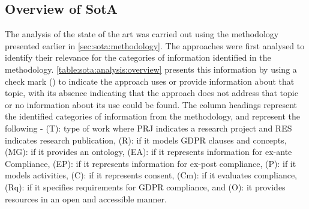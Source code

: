 \subsection{Overview of SotA}
The analysis of the state of the art was carried out using the methodology presented earlier in \autoref{sec:sota:methodology}.
The approaches were first analysed to identify their relevance for the categories of information identified in the methodology.
\autoref{table:sota:analysis:overview} presents this information by using a check mark (\cmark) to indicate the approach uses or provide information about that topic, with its absence indicating that the approach does not address that topic or no information about its use could be found.
The column headings represent the identified categories of information from the methodology, and represent the following - (T): type of work where PRJ indicates a research project and RES indicates research publication, (R): if it models GDPR clauses and concepts, (MG): if it provides an ontology, (EA): if it represents information for ex-ante Compliance, (EP): if it represents information for ex-post compliance, (P): if it models activities, (C): if it represents consent, (Cm): if it evaluates compliance, (Rq): if it specifies requirements for GDPR compliance, and (O): it provides resources in an open and accessible manner.
